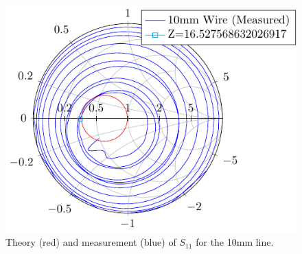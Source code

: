 \documentclass{article}
\begin{document}
\begin{figure}
    \centering
    \includegraphics{figures/build/smith_10mm.pdf}
    \caption{Theory (red) and measurement (blue) of $S_{11}$ for the 10mm line.}
    \label{fig:smith_chart_3mm}
\end{figure}
\end{document}
